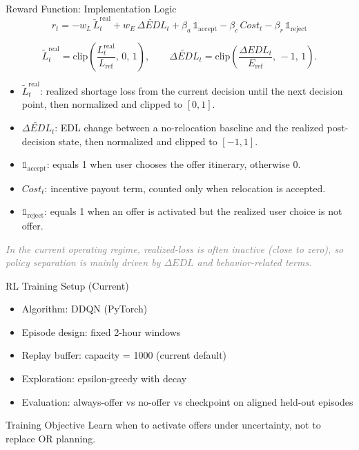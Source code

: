 ﻿\documentclass[aspectratio=169]{beamer}
\newcommand{\tightlist}{\setlength{\itemsep}{4pt}\setlength{\parskip}{0pt}}
\newcommand{\ph}[1]{\textcolor{gray}{\textit{#1}}}
\begin{document}
\begin{frame}{Reward Function: Implementation Logic}
\begin{equation*}
 r_t = -w_L\,\widetilde{L}^{\mathrm{real}}_t + w_E\,\widetilde{\Delta EDL}_t + \beta_a\,\mathbb{1}_{\mathrm{accept}} - \beta_c\,Cost_t - \beta_r\,\mathbb{1}_{\mathrm{reject}}
\end{equation*}

\vspace{-0.4em}
\begin{equation*}
\widetilde{L}^{\mathrm{real}}_t=\mathrm{clip}\!\left(\frac{L^{\mathrm{real}}_t}{L_{\mathrm{ref}}},\,0,\,1\right),
\qquad
\widetilde{\Delta EDL}_t=\mathrm{clip}\!\left(\frac{\Delta EDL_t}{E_{\mathrm{ref}}},\,-1,\,1\right).
\end{equation*}

\begin{itemize}\tightlist
  \item $\widetilde{L}^{\mathrm{real}}_t$: realized shortage loss from the current decision until the next decision point, then normalized and clipped to $[0,1]$.
  \item $\widetilde{\Delta EDL}_t$: EDL change between a no-relocation baseline and the realized post-decision state, then normalized and clipped to $[-1,1]$.
  \item $\mathbb{1}_{\mathrm{accept}}$: equals 1 when user chooses the offer itinerary, otherwise 0.
  \item $Cost_t$: incentive payout term, counted only when relocation is accepted.
  \item $\mathbb{1}_{\mathrm{reject}}$: equals 1 when an offer is activated but the realized user choice is not offer.
\end{itemize}

\vspace{0.4em}
\ph{In the current operating regime, realized-loss is often inactive (close to zero), so policy separation is mainly driven by $\Delta EDL$ and behavior-related terms.}
\end{frame}

\begin{frame}{RL Training Setup (Current)}
\begin{itemize}\tightlist
  \item Algorithm: DDQN (PyTorch)
  \item Episode design: fixed 2-hour windows
  \item Replay buffer: capacity = 1000 (current default)
  \item Exploration: epsilon-greedy with decay
  \item Evaluation: always-offer vs no-offer vs checkpoint on aligned held-out episodes
\end{itemize}

\begin{block}{Training Objective}
Learn when to activate offers under uncertainty, not to replace OR planning.
\end{block}
\end{frame}
\end{document}
